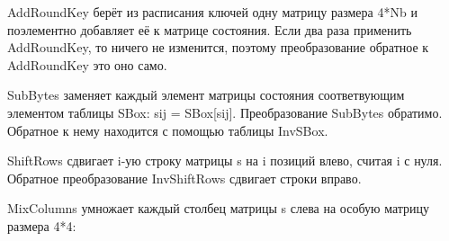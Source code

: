 AddRoundKey берёт из расписания ключей одну матрицу размера 4*Nb и поэлементно добавляет её к матрице состояния. Если два раза применить AddRoundKey, то ничего не изменится, поэтому преобразование обратное к AddRoundKey это оно само.

SubBytes заменяет каждый элемент матрицы состояния соответвующим элементом таблицы SBox: sij = SBox[sij]. Преобразование SubBytes обратимо. Обратное к нему находится с помощью таблицы InvSBox.

ShiftRows сдвигает i-ую строку матрицы s на i позиций влево, считая i с нуля. Обратное преобразование InvShiftRows сдвигает строки вправо.

MixColumns умножает каждый столбец матрицы s слева на особую матрицу размера 4*4:
